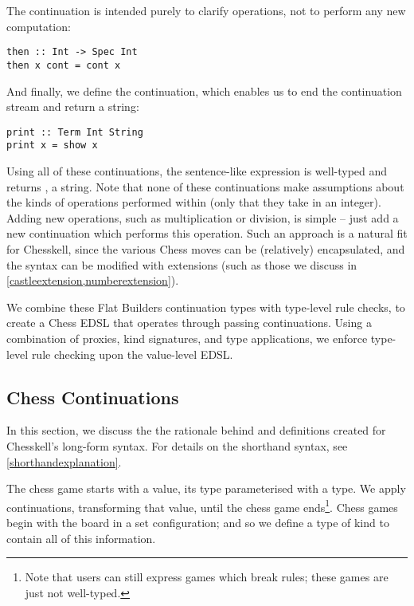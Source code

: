 The continuation  is intended purely to clarify operations, not to perform any new computation:

\begin{lstlisting}
then :: Int -> Spec Int
then x cont = cont x
\end{lstlisting}

And finally, we define the  continuation, which enables us to end the continuation stream and return a string:

\begin{lstlisting}
print :: Term Int String
print x = show x
\end{lstlisting}

Using all of these continuations, the sentence-like expression  is well-typed and returns , a string. Note that none of these continuations make assumptions about the kinds of operations performed within (only that they take in an integer). Adding new operations, such as multiplication or division, is simple -- just add a new continuation which performs this operation. Such an approach is a natural fit for Chesskell, since the various Chess moves can be (relatively) encapsulated, and the syntax can be modified with extensions (such as those we discuss in \cref{castleextension,numberextension}).

We combine these Flat Builders continuation types with type-level rule checks, to create a Chess EDSL that operates through passing continuations. Using a combination of proxies, kind signatures, and type applications, we enforce type-level rule checking upon the value-level EDSL.

\subsection{Chess Continuations}

In this section, we discuss the the rationale behind and definitions created for Chesskell's long-form syntax. For details on the shorthand syntax, see \cref{shorthandexplanation}.

The chess game starts with a  value, its type parameterised with a  type. We apply continuations, transforming that value, until the chess game ends\footnote{Note that users can still express games which break rules; these games are just not well-typed.}. Chess games begin with the board in a set configuration; and so we define a type  of kind  to contain all of this information.

